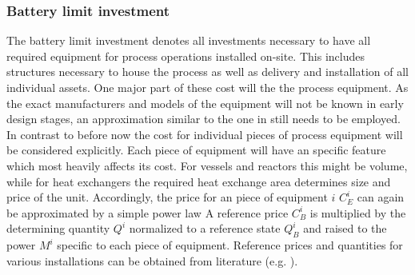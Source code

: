    \subsubsection{Battery limit investment}
        The battery limit investment denotes all investments necessary to have all required equipment
        for process operations installed on-site. This includes structures necessary to house the process as well as
        delivery and installation of all individual assets.  One major part of these cost will the the process
        equipment. As the exact manufacturers and models of the equipment will not be known in early design
        stages, an approximation similar to the one in  still needs to be employed. In contrast to
        before now the cost for individual pieces of process equipment will be considered explicitly.
        Each piece of equipment will have an specific feature which most heavily affects its cost. For vessels and
        reactors this might be volume, while for heat exchangers the required heat exchange area determines size and
        price of the unit.
        Accordingly, the price for an piece of equipment  $i$ $C^{i}_E$ can again be approximated by a simple power law
        A reference price $C^{i}_B$ is multiplied by the determining quantity $Q^{i}$ normalized to a reference state
        $Q^{i}_B$ and raised to the power $M^{i}$ specific to each piece of equipment. Reference prices and
        quantities for various installations can be obtained from literature (e.g. \cite{Seider.2010}).

